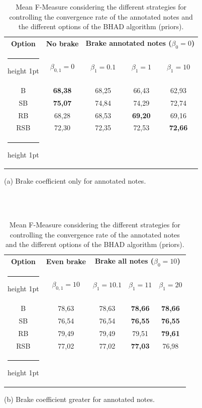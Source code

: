 \documentclass{article}
\makeatletter
\newcommand{\thickhline}{%
    \noalign {\ifnum 0=`}\fi \hrule height 1pt
    \futurelet \reserved@a \@xhline
}
\makeatother
\begin{document}
\begin{table}[htb]
\begin{tabular}{ccccc}
\hline
\textbf{Option} & \textbf{No brake} & \multicolumn{3}{c}{\textbf{Brake annotated notes ($\beta_0=0$)}} \\\thickhline
& $\beta_{0,1}=0$ & $\beta_1=0.1$ & $\beta_1=1$ & $\beta_1=10$ \\\hline
B	& \textbf{68,38} &	68,25	& 66,43 &	 62,93 \\
SB	& \textbf{75,07} &	 74,84 	& 74,29 &	 72,74 \\
RB	& 68,28 & 	 68,53 	& \textbf{69,20} & 	 69,16 \\
RSB	& 72,30 &	 72,35 	& 72,53 &	 \textbf{72,66} \\\thickhline
\end{tabular}
  \centerline{(a) Brake coefficient only for annotated notes.}
\\
\\%


 \begin{tabular}{ccccc}
 \hline
\textbf{Option} & \textbf{Even brake} & \multicolumn{3}{c}{\textbf{Brake all notes ($\beta_0=10$)}} \\\thickhline
& $\beta_{0,1}=10$ & $\beta_1=10.1$ & $\beta_1=11$ & $\beta_1=20$ \\\hline
B	& 78,63 &	78,63 & \textbf{78,66} &	\textbf{78,66} \\
SB	& 76,54 &	 76,54 &	\textbf{76,55} &	\textbf{76,55} \\
RB	& 79,49 &	 79,49 &	79,51 &	\textbf{79,61} \\
RSB	& 77,02 &	 77,02 &	\textbf{77,03} &	76,98 \\\thickhline
\end{tabular}
  \centerline{(b) Brake coefficient greater for annotated notes.}\medskip
\caption{Mean F-Measure considering the different strategies for controlling the convergence rate of the annotated notes and the different options of the BHAD algorithm (priors).}
\label{tab:brake}
\end{table}
\end{document}
